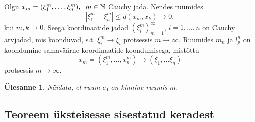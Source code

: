 \documentclass{article}[12pt]
\newcommand{\h}{\hspace{0.2cm}}
\newcommand{\N}{\mathbb{N}}
\newtheorem{yl}{Ülesanne}[section]
\theoremstyle{definition}
\theoremstyle{definition}
\theoremstyle{definition}
\theoremstyle{break}
\begin{document}
Olgu $x_m=(\xi_1^m,\dots,\xi_n^m),\h m\in\N$ Cauchy jada.
Nendes ruumides
\[
	|\xi_1^m-\xi_n^m|\leq d(x_m,x_k) \rightarrow 0,
\]
kui $m,k\rightarrow 0$.
Seega koordinaatide jadad $(\xi_i^m)_{m=1}^\infty$, $i=1,\dots,n$ on Cauchy arvjadad, mis koonduvad, s.t. $\xi_i^m\rightarrow\xi_i$ protsessis $m\rightarrow\infty$.
Ruumides $m_n$ ja $l_p^n$ on koondumine samaväärne koordinaatide koondumisega, mistõttu 
\[
	x_m = (\xi_1^m,\dots,x_n^m) \rightarrow (\xi_1,\dots \xi_n)
\]
protsessis $m\rightarrow \infty$.

\begin{yl}
	Näidata, et ruum $c_0$ on kinnine ruumis $m$.
\end{yl}

\subsection{Teoreem üksteisesse sisestatud keradest}
\end{document}
